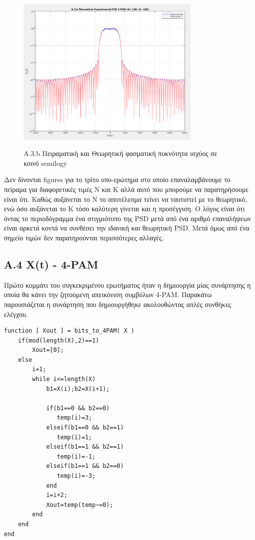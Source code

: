 \documentclass[11pt]{article}
\begin{document}
      \begin{figure}[H]
        \centering
        \includegraphics[scale=0.5, width=0.8\textwidth]{figures/A3.2-T_E_PSD.png} \\
        \caption{A.3.b Πειραματική και Θεωρητική φασματική πυκνότητα ισχύος σε κοινό semilogy}
    \end{figure}
    
    \par \noindent
    Δεν δίνονται figures για το τρίτο υπο-ερώτημα στο οποίο επαναλαμβάνουμε το πείραμα για διαφορετικές τιμές Ν και Κ αλλά αυτό που μπορούμε να παρατηρήσουμε είναι ότι.
    Καθώς αυξάνεται το Ν το αποτέλεσμα τείνει να ταυτιστεί με το θεωρητικό, ενώ όσο αυξάνεται το Κ τόσο καλύτερη γίνεται και η προσέγγιση.
    Ο λόγος είναι ότι όντας το περιοδόγραμμα ένα στιγμιότυπο της PSD μετά από ένα αριθμό επαναλήψεων είναι αρκετά κοντά να συνθέσει την ιδανική και θεωρητική PSD.
    Μετά όμως από ένα σημείο τιμών δεν παρατηρούνται περισσότερες αλλαγές.
    
    \subsection*{A.4 X(t) - 4-PAM }
    Πρώτο κομμάτι του συγκεκριμένου ερωτήματος ήταν η δημιουργία μίας συνάρτησης η οποία θα κάνει την ζητούμενη απεικόνιση συμβόλων 4-PAM.
    Παρακάτω παρουσιάζεται η συνάρτηση που δημιουργήθηκε ακολουθώντας απλές συνθήκες ελέγχου.
    
    \begin{lstlisting}[caption = {\emph{\texttt{bits\_to\_4PAM.m}}}]
function [ Xout ] = bits_to_4PAM( X )
    if(mod(length(X),2)==1)
        Xout=[0];
    else
        i=1;
        while i<=length(X)
            b1=X(i);b2=X(i+1);
 
            if(b1==0 && b2==0)
               temp(i)=3; 
            elseif(b1==0 && b2==1)
               temp(i)=1;
            elseif(b1==1 && b2==1)
               temp(i)=-1; 
            elseif(b1==1 && b2==0)
               temp(i)=-3;      
            end
            i=i+2;
            Xout=temp(temp~=0);
        end
    end
end
    \end{lstlisting}
    
\end{document}
